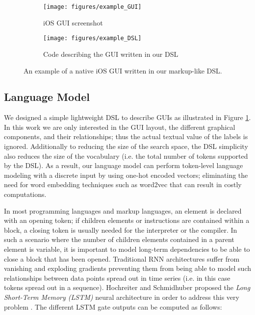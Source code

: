 \documentclass{article}
\begin{document}
\begin{figure}[H]
    \begin{subfigure}{.5\textwidth}
        \centering
        \texttt{[image: figures/example\_GUI]}
        \caption{iOS GUI screenshot}
    \end{subfigure}
    \begin{subfigure}{.5\textwidth}
        \centering
        \texttt{[image: figures/example\_DSL]}
        \caption{Code describing the GUI written in our DSL}
    \end{subfigure}
    \caption{An example of a native iOS GUI written in our markup-like DSL.}
    \label{fig:dsl}
\end{figure}

\subsection{Language Model}

We designed a simple lightweight DSL to describe GUIs as illustrated in Figure \ref{fig:dsl}. In this work we are only interested in the GUI layout, the different graphical components, and their relationships; thus the actual textual value of the labels is ignored. Additionally to reducing the size of the search space, the DSL simplicity also reduces the size of the vocabulary (i.e. the total number of tokens supported by the DSL). As a result, our language model can perform token-level language modeling with a discrete input by using one-hot encoded vectors; eliminating the need for word embedding techniques such as word2vec \cite{mikolov2013distributed} that can result in costly computations.

In most programming languages and markup languages, an element is declared with an opening token; if children elements or instructions are contained within a block, a closing token is usually needed for the interpreter or the compiler. In such a scenario where the number of children elements contained in a parent element is variable, it is important to model long-term dependencies to be able to close a block that has been opened.
Traditional RNN architectures suffer from vanishing and exploding gradients preventing them from being able to model such relationships between data points spread out in time series (i.e. in this case tokens spread out in a sequence). Hochreiter and Schmidhuber proposed the \emph{Long Short-Term Memory (LSTM)} neural architecture in order to address this very problem \cite{hochreiter1997long}. The different LSTM gate outputs can be computed as follows:
\end{document}
